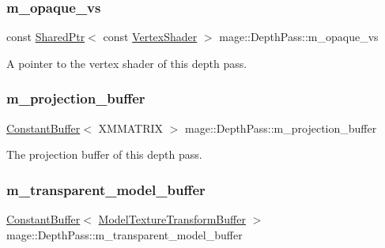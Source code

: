 \subsubsection{\texorpdfstring{m\+\_\+opaque\+\_\+vs}{m\_opaque\_vs}}
{\footnotesize\ttfamily const \hyperlink{namespacemage_a1e01ae66713838a7a67d30e44c67703e}{Shared\+Ptr}$<$ const \hyperlink{classmage_1_1_vertex_shader}{Vertex\+Shader} $>$ mage\+::\+Depth\+Pass\+::m\+\_\+opaque\+\_\+vs\hspace{0.3cm}{\ttfamily [private]}}

A pointer to the vertex shader of this depth pass. \hypertarget{classmage_1_1_depth_pass_a4c9833ceaf223b73404edab4cf81b7c1}{}\label{classmage_1_1_depth_pass_a4c9833ceaf223b73404edab4cf81b7c1} 
\subsubsection{\texorpdfstring{m\+\_\+projection\+\_\+buffer}{m\_projection\_buffer}}
{\footnotesize\ttfamily \hyperlink{classmage_1_1_constant_buffer}{Constant\+Buffer}$<$ X\+M\+M\+A\+T\+R\+IX $>$ mage\+::\+Depth\+Pass\+::m\+\_\+projection\+\_\+buffer\hspace{0.3cm}{\ttfamily [private]}}

The projection buffer of this depth pass. \hypertarget{classmage_1_1_depth_pass_a4b6a38c56e02b6185c1eef8bcaaa5786}{}\label{classmage_1_1_depth_pass_a4b6a38c56e02b6185c1eef8bcaaa5786} 
\subsubsection{\texorpdfstring{m\+\_\+transparent\+\_\+model\+\_\+buffer}{m\_transparent\_model\_buffer}}
{\footnotesize\ttfamily \hyperlink{classmage_1_1_constant_buffer}{Constant\+Buffer}$<$ \hyperlink{structmage_1_1_model_texture_transform_buffer}{Model\+Texture\+Transform\+Buffer} $>$ mage\+::\+Depth\+Pass\+::m\+\_\+transparent\+\_\+model\+\_\+buffer\hspace{0.3cm}{\ttfamily [private]}}

